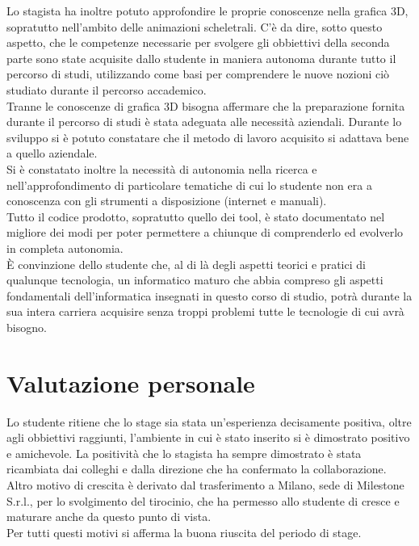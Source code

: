 Lo stagista ha inoltre potuto approfondire le proprie conoscenze nella grafica 3D, sopratutto nell'ambito delle animazioni scheletrali. C'è da dire, sotto questo aspetto, che le competenze necessarie per svolgere gli obbiettivi della seconda parte sono state acquisite dallo studente in maniera autonoma durante tutto il percorso di studi, utilizzando come basi per comprendere le nuove nozioni ciò studiato durante il percorso accademico.\\

Tranne le conoscenze di grafica 3D bisogna affermare che la preparazione fornita durante il percorso di studi è stata adeguata alle necessità aziendali. Durante lo sviluppo si è potuto constatare che il metodo di lavoro acquisito si adattava bene a quello aziendale.\\

Si è constatato inoltre la necessità di autonomia nella ricerca e nell'approfondimento di particolare tematiche di cui lo studente non era a conoscenza con gli strumenti a disposizione (internet e manuali).\\

Tutto il codice prodotto, sopratutto quello dei tool, è stato documentato nel migliore dei modi per poter permettere a chiunque di comprenderlo ed evolverlo in completa autonomia.\\

È convinzione dello studente che, al di là degli aspetti teorici e pratici di qualunque tecnologia, un informatico maturo che abbia compreso gli aspetti fondamentali dell'informatica insegnati in questo corso di studio, potrà durante la sua intera carriera acquisire senza troppi problemi tutte le tecnologie di cui avrà bisogno.

\section{Valutazione personale}

Lo studente ritiene che lo stage sia stata un'esperienza decisamente positiva, oltre agli obbiettivi raggiunti, l'ambiente in cui è stato inserito si è dimostrato positivo e amichevole. La positività che lo stagista ha sempre dimostrato è stata ricambiata dai colleghi e dalla direzione che ha confermato la collaborazione. Altro motivo di crescita è derivato dal trasferimento a Milano, sede di Milestone S.r.l., per lo svolgimento del tirocinio, che ha permesso allo studente di cresce e maturare anche da questo punto di vista.\\

Per tutti questi motivi si afferma la buona riuscita del periodo di stage.
